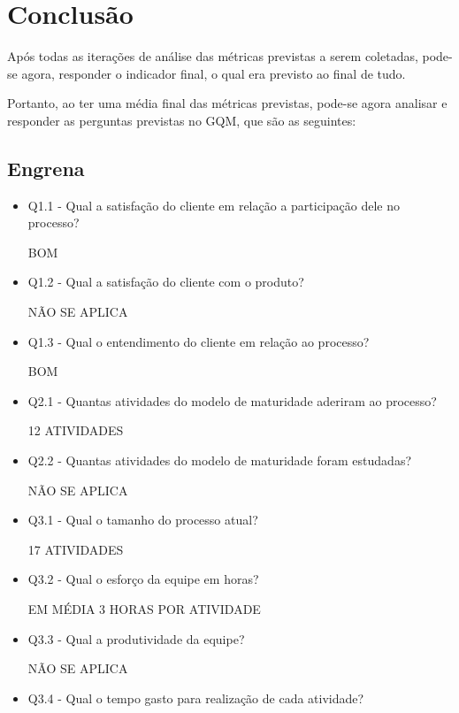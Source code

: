 \chapter{Conclusão}

Após todas as iterações de análise das métricas previstas a serem coletadas, pode-se agora, responder o indicador final, o qual era previsto ao final de tudo.

Portanto, ao ter uma média final das métricas previstas, pode-se agora analisar e responder as perguntas previstas no GQM, que são as seguintes:

\section{Engrena}

\begin{itemize}
\item Q1.1 - Qual a satisfação do cliente em relação a participação dele no processo?

BOM

\item Q1.2 - Qual a satisfação do cliente com o produto?

NÃO SE APLICA

\item Q1.3 - Qual o entendimento do cliente em relação ao processo?

BOM

\item Q2.1 - Quantas atividades do modelo de maturidade aderiram ao processo?

12 ATIVIDADES

\item Q2.2 - Quantas atividades do modelo de maturidade foram estudadas?

NÃO SE APLICA

\item Q3.1 - Qual o tamanho do processo atual?

17 ATIVIDADES

\item Q3.2 - Qual o esforço da equipe em horas?

EM MÉDIA 3 HORAS POR ATIVIDADE

\item Q3.3 - Qual a produtividade da equipe?

NÃO SE APLICA

\item Q3.4 - Qual o tempo gasto para realização de cada atividade?



\end{itemize}
